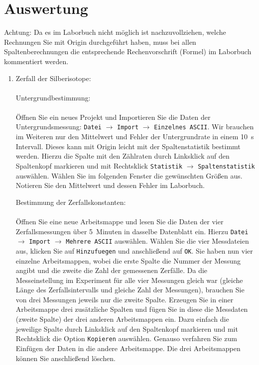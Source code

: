 \documentclass[landscape,twocolumn]{article}
\begin{document}
\section{Auswertung}
Achtung: Da es im Laborbuch nicht m\"{o}glich ist nachzuvollziehen, welche Rechnungen Sie mit Origin durchgef\"{u}hrt haben, muss bei allen Spaltenberechnungen die entsprechende Rechenvorschrift (Formel) im Laborbuch kommentiert werden.
\begin{enumerate}
\item Zerfall der Silberisotope:\\
\\
Untergrundbestimmung:\\
\\
\"{O}ffnen Sie ein neues Projekt und Importieren Sie die Daten der Untergrundsmessung:
\verb"Datei" $\rightarrow$ \verb"Import" $\rightarrow$ \verb"Einzelnes ASCII".
Wir brauchen im Weiteren nur den Mittelwert und Fehler der Untergrundrate in einem 10~s Intervall. Dieses kann mit Origin leicht mit der Spaltenstatistik bestimmt werden. Hierzu die Spalte mit den Z\"{a}hlraten durch Linksklick auf den Spaltenkopf markieren und mit Rechtsklick \verb"Statistik" $\rightarrow$ \verb"Spaltenstatistik" ausw\"{a}hlen. W\"{a}hlen Sie im folgenden Fenster die gew\"{u}nschten Gr\"{o}{\ss}en aus. Notieren Sie den Mittelwert und dessen Fehler im Laborbuch.

Bestimmung der Zerfallskonstanten:\\
\\
\"{O}ffnen Sie eine neue Arbeitsmappe und lesen Sie die Daten der vier Zerfallsmessungen \"{u}ber 5~Minuten in dasselbe Datenblatt ein.
Hierzu \verb"Datei" $\rightarrow$ \verb"Import" $\rightarrow$ \verb"Mehrere ASCII" ausw\"{a}hlen. W\"{a}hlen Sie die vier Messdateien aus, klicken Sie auf \verb"Hinzufuegen"  und anschlie{\ss}end auf \verb"OK". Sie haben nun vier einzelne Arbeitsmappen, wobei die erste Spalte die Nummer der Messung angibt und die zweite die Zahl der gemessenen Zerf\"{a}lle. Da die Messeinstellung im Experiment f\"{u}r alle vier Messungen gleich war (gleiche L\"{a}nge des Zerfallsintervalls und gleiche Zahl der Messungen), brauchen Sie von drei Messungen jeweils nur die zweite Spalte. Erzeugen Sie in einer Arbeitsmappe drei zus\"{a}tzliche Spalten und f\"{u}gen Sie in diese die Messdaten (zweite Spalte) der drei anderen Arbeitsmappen ein. Dazu einfach die jeweilige Spalte durch Linksklick auf den Spaltenkopf markieren und mit Rechtsklick die Option \verb"Kopieren" ausw\"{a}hlen. Genauso verfahren Sie zum Einf\"{u}gen der Daten in die andere Arbeitsmappe. Die drei Arbeitsmappen k\"{o}nnen Sie anschlie{\ss}end l\"{o}schen.


\end{enumerate}
\end{document}
